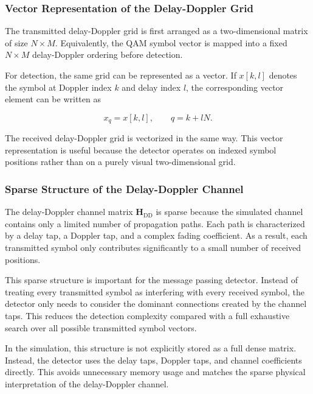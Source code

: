 \subsubsection{Vector Representation of the Delay-Doppler Grid}

The transmitted delay-Doppler grid is first arranged as a two-dimensional matrix of size \(N \times M\). Equivalently, the QAM symbol vector is mapped into a fixed \(N \times M\) delay-Doppler ordering before detection.

For detection, the same grid can be represented as a vector. If \(x[k,l]\) denotes the symbol at Doppler index \(k\) and delay index \(l\), the corresponding vector element can be written as

\begin{equation}
    x_{q} = x[k,l],
    \qquad
    q = k + lN .
\end{equation}

The received delay-Doppler grid is vectorized in the same way. This vector representation is useful because the detector operates on indexed symbol positions rather than on a purely visual two-dimensional grid.

\subsubsection{Sparse Structure of the Delay-Doppler Channel}

The delay-Doppler channel matrix \(\mathbf{H}_{\mathrm{DD}}\) is sparse because the simulated channel contains only a limited number of propagation paths. Each path is characterized by a delay tap, a Doppler tap, and a complex fading coefficient. As a result, each transmitted symbol only contributes significantly to a small number of received positions.

This sparse structure is important for the message passing detector. Instead of treating every transmitted symbol as interfering with every received symbol, the detector only needs to consider the dominant connections created by the channel taps. This reduces the detection complexity compared with a full exhaustive search over all possible transmitted symbol vectors.

In the simulation, this structure is not explicitly stored as a full dense matrix. Instead, the detector uses the delay taps, Doppler taps, and channel coefficients directly. This avoids unnecessary memory usage and matches the sparse physical interpretation of the delay-Doppler channel.

